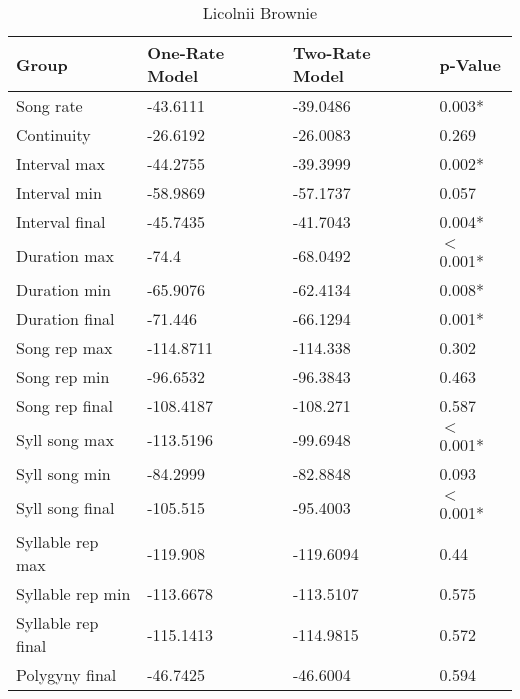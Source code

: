 \documentclass{article}\usepackage[]{graphicx}\usepackage[]{color}
\begin{document}
\begin{table}[ht]
\centering
\caption{Licolnii Brownie}
\begin{tabular}{llll}
  \hline
Group & One-Rate Model & Two-Rate Model & p-Value \\ 
  \hline
Song rate & -43.6111 & -39.0486 & 0.003* \\ 
  Continuity & -26.6192 & -26.0083 & 0.269 \\ 
  Interval max & -44.2755 & -39.3999 & 0.002* \\ 
  Interval min & -58.9869 & -57.1737 & 0.057 \\ 
  Interval final & -45.7435 & -41.7043 & 0.004* \\ 
  Duration max & -74.4 & -68.0492 & $<$0.001* \\ 
  Duration min & -65.9076 & -62.4134 & 0.008* \\ 
  Duration final & -71.446 & -66.1294 & 0.001* \\ 
  Song rep max & -114.8711 & -114.338 & 0.302 \\ 
  Song rep min & -96.6532 & -96.3843 & 0.463 \\ 
  Song rep final & -108.4187 & -108.271 & 0.587 \\ 
  Syll song max & -113.5196 & -99.6948 & $<$0.001* \\ 
  Syll song min & -84.2999 & -82.8848 & 0.093 \\ 
  Syll song final & -105.515 & -95.4003 & $<$0.001* \\ 
  Syllable rep max & -119.908 & -119.6094 & 0.44 \\ 
  Syllable rep min & -113.6678 & -113.5107 & 0.575 \\ 
  Syllable rep final & -115.1413 & -114.9815 & 0.572 \\ 
  Polygyny final & -46.7425 & -46.6004 & 0.594 \\ 
   \hline
\end{tabular}
\end{table}
\end{document}
